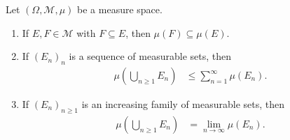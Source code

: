 \begin{lemma}
  Let $\left(\Omega,\mathcal{M},\mu\right)$ be a measure space.
  \begin{enumerate}[(1)]
    \item If $E,F\in \mathcal{M}$ with $F\subseteq E$, then $\mu\left(F\right) \subseteq \mu\left(E\right)$.
    \item If $\left(E_n\right)_{n}$ is a sequence of measurable sets, then
      \begin{align*}
        \mu\left(\bigcup_{n\geq 1}E_n\right) &\leq \sum_{n=1}^{\infty}\mu\left(E_n\right).
      \end{align*}
    \item If $\left(E_n\right)_{n\geq 1}$ is an increasing family of measurable sets, then
      \begin{align*}
        \mu\left(\bigcup_{n\geq 1}E_n\right) &= \lim_{n\rightarrow\infty}\mu\left(E_n\right).
      \end{align*}
  \end{enumerate}
\end{lemma}
